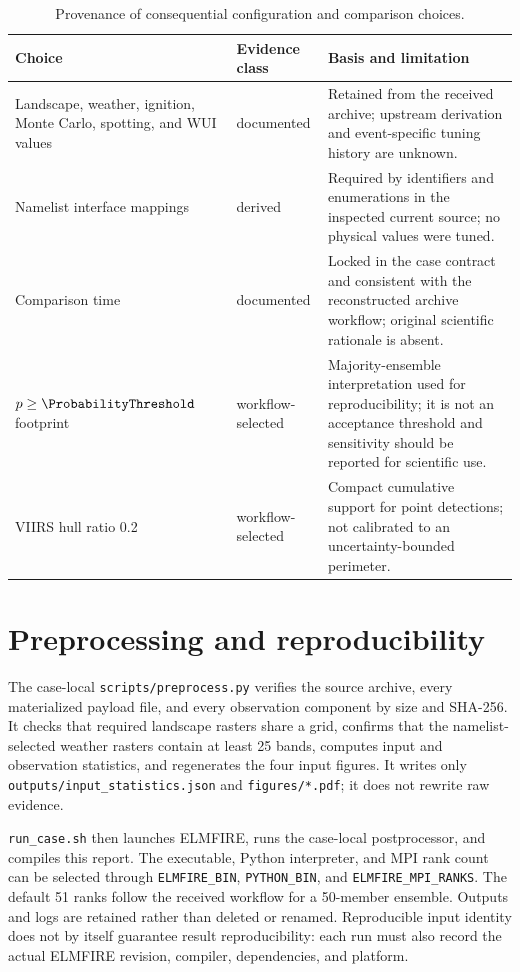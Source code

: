 \begin{table}[H]
\centering
\begin{tabular}{@{}p{}p{}p{}@{}}
\toprule
Choice & Evidence class & Basis and limitation \\
\midrule
Landscape, weather, ignition, Monte Carlo, spotting, and WUI values & documented & Retained from the received archive; upstream derivation and event-specific tuning history are unknown. \\
Namelist interface mappings & derived & Required by identifiers and enumerations in the inspected current source; no physical values were tuned. \\
Comparison time & documented & Locked in the case contract and consistent with the reconstructed archive workflow; original scientific rationale is absent. \\
$p\geq\ProbabilityThreshold$ footprint & workflow-selected & Majority-ensemble interpretation used for reproducibility; it is not an acceptance threshold and sensitivity should be reported for scientific use. \\
VIIRS hull ratio 0.2 & workflow-selected & Compact cumulative support for point detections; not calibrated to an uncertainty-bounded perimeter. \\
\bottomrule
\end{tabular}
\caption{Provenance of consequential configuration and comparison choices.}
\end{table}

\section{Preprocessing and reproducibility}

The case-local \texttt{scripts/preprocess.py} verifies the source archive,
every materialized payload file, and every observation component by size and
SHA-256.  It checks that required landscape rasters share a grid, confirms that
the namelist-selected weather rasters contain at least 25 bands, computes input
and observation statistics, and regenerates the four input figures.  It writes
only \texttt{outputs/input\_statistics.json} and \texttt{figures/*.pdf}; it does
not rewrite raw evidence.

\texttt{run\_case.sh} then launches ELMFIRE, runs the case-local postprocessor,
and compiles this report.  The executable, Python interpreter, and MPI rank
count can be selected through \texttt{ELMFIRE\_BIN}, \texttt{PYTHON\_BIN}, and
\texttt{ELMFIRE\_MPI\_RANKS}.  The default 51 ranks follow the received workflow
for a 50-member ensemble.  Outputs and logs are retained rather than deleted or
renamed.  Reproducible input identity does not by itself guarantee result
reproducibility: each run must also record the actual ELMFIRE revision,
compiler, dependencies, and platform.

